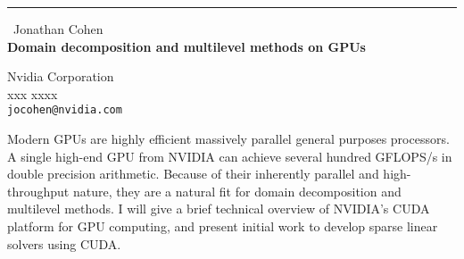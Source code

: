 \documentclass{report}
\begin{document}
\begin{center}
\rule{6in}{1pt} \
{\large Jonathan Cohen \\
{\bf Domain decomposition and multilevel methods on GPUs}}

Nvidia Corporation \\ xxx xxxx
\\
{\tt jocohen@nvidia.com}\end{center}

Modern GPUs are highly efficient massively parallel general purposes
processors. A single high-end GPU from NVIDIA can achieve several hundred
GFLOPS/s in double precision arithmetic. Because of their inherently
parallel and high-throughput nature, they are a natural fit for domain
decomposition and multilevel methods. I will give a brief technical
overview of NVIDIA's CUDA platform for GPU computing, and present initial
work to develop sparse linear solvers using CUDA.
\end{document}
